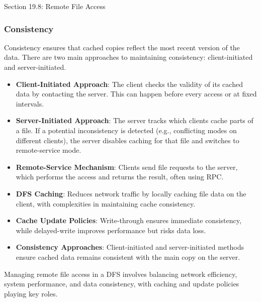 \begin{notes}{Section 19.8: Remote File Access}
\begin{highlight}
    \end{highlight}
    
    \subsubsection*{Consistency}
    
    Consistency ensures that cached copies reflect the most recent version of the data. There are two main approaches to maintaining consistency: client-initiated and server-initiated.
    
    \begin{highlight}[Consistency]
    
        \begin{itemize}
            \item \textbf{Client-Initiated Approach}: The client checks the validity of its cached data by contacting the server. This can happen before every access or at fixed intervals.
            \item \textbf{Server-Initiated Approach}: The server tracks which clients cache parts of a file. If a potential inconsistency is detected (e.g., conflicting modes on different clients), 
            the server disables caching for that file and switches to remote-service mode.
        \end{itemize}
    
    \end{highlight}
    
    \begin{highlight}
    
        \begin{itemize}
            \item \textbf{Remote-Service Mechanism}: Clients send file requests to the server, which performs the access and returns the result, often using RPC.
            \item \textbf{DFS Caching}: Reduces network traffic by locally caching file data on the client, with complexities in maintaining cache consistency.
            \item \textbf{Cache Update Policies}: Write-through ensures immediate consistency, while delayed-write improves performance but risks data loss.
            \item \textbf{Consistency Approaches}: Client-initiated and server-initiated methods ensure cached data remains consistent with the main copy on the server.
        \end{itemize}
    
    Managing remote file access in a DFS involves balancing network efficiency, system performance, and data consistency, with caching and update policies playing key roles.
    
    \end{highlight}
\end{notes}

